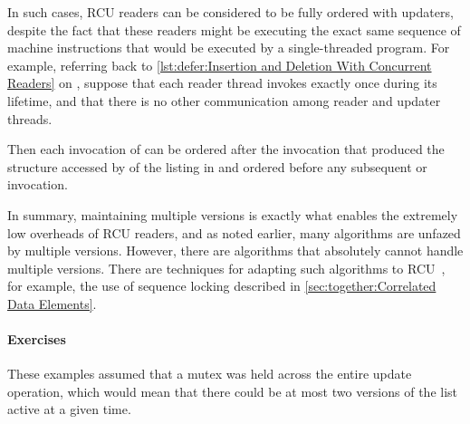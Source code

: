 In such cases, RCU readers can be considered to be fully ordered with
updaters, despite the fact that these readers might be executing the
exact same sequence of machine instructions that would be executed by
a single-threaded program.
For example, referring back to
\cref{lst:defer:Insertion and Deletion With Concurrent Readers}
on ,
suppose that each reader thread invokes  exactly
once during its lifetime, and that there is no other communication among
reader and updater threads.
\begin{fcvref}
Then each invocation of  can be ordered after the
 invocation that produced the  structure
accessed by  of the listing in 
and ordered before any subsequent
 or  invocation.
\end{fcvref}

In summary, maintaining multiple versions is exactly what enables the
extremely low overheads of RCU readers, and as noted earlier, many
algorithms are unfazed by multiple versions.
However, there are algorithms that absolutely cannot handle multiple versions.
There are techniques for adapting such algorithms to
RCU~\cite{PaulEdwardMcKenneyPhD}, for example, the use of sequence locking
described in \cref{sec:together:Correlated Data Elements}.

\paragraph{Exercises}
\label{sec:defer:Exercises}

These examples assumed that a mutex was held across the entire
update operation, which would mean that there could be at most two
versions of the list active at a given time.

